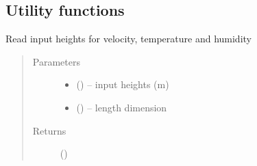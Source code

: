 \documentclass[letterpaper,10pt,english]{sphinxmanual}
\begin{document}
\subsection{Utility functions}
\label{\detokenize{index:utility-functions}}
\label{\detokenize{index:module-util_subs}}

\begin{fulllineitems}
\label{\detokenize{index:util_subs.get_heights}}
Read input heights for velocity, temperature and humidity
\begin{quote}\begin{description}
\item[{Parameters}] \leavevmode\begin{itemize}
\item {} 
 (\href{https://docs.python.org/3/library/functions.html\#float}{}) -- input heights (m)

\item {} 
 (\href{https://docs.python.org/3/library/functions.html\#int}{}) -- length dimension
\end{itemize}

\item[{Returns}] \leavevmode
{} (\href{https://docs.python.org/3/library/functions.html\#float}{})

\end{description}\end{quote}

\end{fulllineitems}


\end{document}

